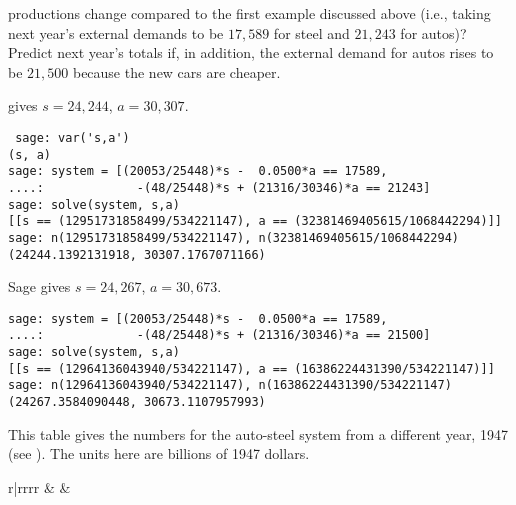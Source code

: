 \begin{exercises}
\begin{exparts}
        productions change compared to the first example discussed
        above (i.e., taking next year's external demands to be
        $17,589$ for steel and $21,243$ for autos)?
      \partsitem Predict next year's totals if, in addition,
        the external demand for
        autos rises to be $21,500$ because the new cars are cheaper.
    \end{exparts}
    \begin{answer}
      \begin{exparts}
        \partsitem \Sage{} gives  $s=24,244$, $a=30,307$.
\begin{lstlisting}
 sage: var('s,a')
(s, a)
sage: system = [(20053/25448)*s -  0.0500*a == 17589,
....:             -(48/25448)*s + (21316/30346)*a == 21243]
sage: solve(system, s,a)
[[s == (12951731858499/534221147), a == (32381469405615/1068442294)]]
sage: n(12951731858499/534221147), n(32381469405615/1068442294)
(24244.1392131918, 30307.1767071166)         
\end{lstlisting}
        \partsitem Sage gives $s=24,267$, $a=30,673$.
\begin{lstlisting}
sage: system = [(20053/25448)*s -  0.0500*a == 17589,
....:             -(48/25448)*s + (21316/30346)*a == 21500]
sage: solve(system, s,a)
[[s == (12964136043940/534221147), a == (16386224431390/534221147)]]
sage: n(12964136043940/534221147), n(16386224431390/534221147)
(24267.3584090448, 30673.1107957993)          
\end{lstlisting}
      \end{exparts}
    \end{answer}
  \item 
    This table gives the numbers for the auto-steel system from
    a different year, 1947 (see \cite{Leontief1951}).
    The units here are billions of 1947 dollars.
    \begin{center}
      \begin{tabular}{r|rrrr}
             &
             &

\end{tabular}
\end{center}
\end{exercises}
